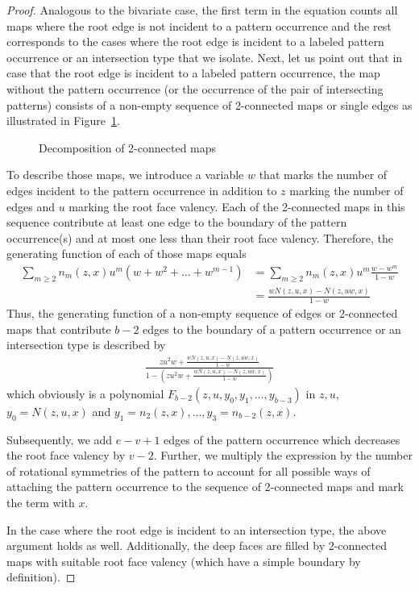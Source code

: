 \documentclass[10pt,a4paper]{amsart}
\begin{document}
\begin{proof}
    Analogous to the bivariate case, the first term in the equation counts all maps where the root edge is not incident to a pattern occurrence and the rest corresponds to the cases where the root edge is incident to a labeled pattern occurrence or an intersection type that we isolate.
    Next, let us point out that in case that the root edge is incident to a labeled pattern occurrence, the map without the pattern occurrence (or the occurrence of the pair of intersecting patterns) consists of a non-empty sequence of 2-connected maps or single edges as illustrated in Figure~\ref{fig:non-sep}. 

    \begin{figure}
        \centering
        
        \caption{Decomposition of 2-connected maps}
        \label{fig:non-sep}
    \end{figure}
    
    To describe those maps, we introduce a variable $w$ that marks the number of edges incident to the pattern occurrence in addition to $z$ marking the number of edges and $u$ marking the root face valency. Each of the 2-connected maps in this sequence contribute at least one edge to the boundary of the pattern occurrence(s) and at most one less than their root face valency. Therefore, the generating function of each of those maps equals
    \begin{align*}
        \sum_{m\geq 2} n_m(z,x)u^m(w+w^2+\dots+w^{m-1})
        &=\sum_{m\geq 2} n_m(z,x)u^m\frac{w-w^m}{1-w}\\
        &=\frac{wN(z,u,x)-N(z,uw,x)}{1-w}
    \end{align*}
    Thus, the generating function of a non-empty sequence of edges or 2-connected maps that contribute $b-2$ edges to the boundary of a pattern occurrence or an intersection type is described by
    \begin{align*}
        [w^{b-2}] \frac{zu^2w+\frac{wN(z,u,x)-N(z,uw,x)}{1-w}}{1-\left(zu^2w+\frac{wN(z,u,x)-N(z,uw,x)}{1-w}\right)}
    \end{align*}
    which obviously is a polynomial $F_{b-2}(z,u,y_0,y_1,\dots, y_{b-3})$ in $z,u,$ $y_0=N(z,u,x)$ and $y_1 =n_2(z,x), \dots, y_3 = n_{b-2}(z,x)$.

    Subsequently, we add $e-v+1$ edges of the pattern occurrence which decreases the root face valency by $v-2$. Further, we multiply the expression by the number of rotational symmetries of the pattern to account for all possible ways of attaching the pattern occurrence to the sequence of 2-connected maps and mark the term with $x$.

    In the case where the root edge is incident to an intersection type, the above argument holds as well. Additionally, the deep faces are filled by 2-connected maps with suitable root face valency (which have a simple boundary by definition).
\end{proof}
\end{document}
